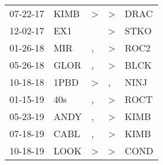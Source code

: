 \begin{supertabular}{p{0.07\textwidth}p{0.06\textwidth}p{0.02\textwidth}p{0.02\textwidth}p{0.06\textwidth}}
          07-22-17\textsuperscript{} &           KIMB\textsuperscript{} &     \textgreater &     \textgreater &           DRAC\textsuperscript{} \\
          12-02-17\textsuperscript{} &            EX1\textsuperscript{} &                  &     \textgreater &           STKO\textsuperscript{} \\
          01-26-18\textsuperscript{} &            MIR\textsuperscript{} &                , &     \textgreater &           ROC2\textsuperscript{} \\
          05-26-18\textsuperscript{} &           GLOR\textsuperscript{} &                , &     \textgreater &           BLCK\textsuperscript{} \\
          10-18-18\textsuperscript{} &           1PBD\textsuperscript{} &     \textgreater &                , &           NINJ\textsuperscript{} \\
          01-15-19\textsuperscript{} &            40s\textsuperscript{} &                , &     \textgreater &           ROCT\textsuperscript{} \\
          05-23-19\textsuperscript{} &           ANDY\textsuperscript{} &                , &     \textgreater &           KIMB\textsuperscript{} \\
          07-18-19\textsuperscript{} &           CABL\textsuperscript{} &                , &     \textgreater &           KIMB\textsuperscript{} \\
          10-18-19\textsuperscript{} &           LOOK\textsuperscript{} &     \textgreater &     \textgreater &           COND\textsuperscript{} \\
\end{supertabular}
